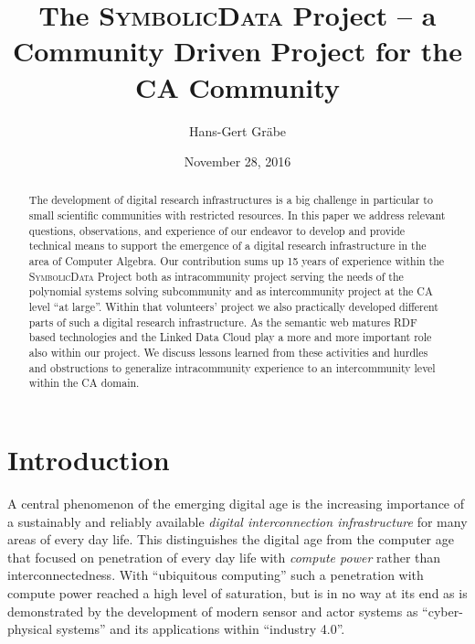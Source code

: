 \documentclass{mathincs}
\newcommand{\SD}{\textsc{Symbo\-lic\-Data}}
\begin{document}
\title[The \textsc{SymbolicData} Project]{The \textsc{SymbolicData} Project --
  a Community Driven Project for the CA Community}

\author[Hans-Gert Gr\"abe]{Hans-Gert Gr\"abe}
\address{Computer Science Department\\ Leipzig
  University\\ Augustusplatz~10\\ D~04109 Leipzig\\ Germany} 


\date{November 28, 2016}

\begin{abstract}
  The development of digital research infrastructures is a big challenge in
  particular to small scientific communities with restricted resources.  In
  this paper we address relevant questions, observations, and experience of our
  endeavor to develop and provide technical means to support the emergence of a
  digital research infrastructure in the area of Computer Algebra.  Our
  contribution sums up 15 years of experience within the {\SD} Project both as
  intracommunity project serving the needs of the polynomial systems solving
  subcommunity and as intercommunity project at the CA level ``at large''.
  Within that volunteers' project we also practically developed different parts
  of such a digital research infrastructure.  As the semantic web matures RDF
  based technologies and the Linked Data Cloud play a more and more important
  role also within our project.  We discuss lessons learned from these
  activities and hurdles and obstructions to generalize intracommunity
  experience to an intercommunity level within the CA domain.
\end{abstract}

\maketitle

\section{Introduction}

A central phenomenon of the emerging digital age is the increasing importance
of a sustainably and reliably available \emph{digital interconnection
  infrastructure} for many areas of every day life. This distinguishes the
digital age from the computer age that focused on penetration of every day
life with \emph{compute power} rather than interconnectedness.  With
``ubiquitous computing'' such a penetration with compute power reached a high
level of saturation, but is in no way at its end as is demonstrated by the
development of modern sensor and actor systems as ``cyber-physical systems''
and its applications within ``industry 4.0''. 
\end{document}
